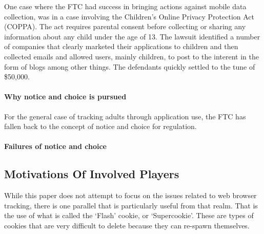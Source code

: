 One case where the FTC had success in bringing actions against mobile data collection, was in a case involving the Children's Online Privacy Protection Act (COPPA). The act requires parental consent before collecting or sharing any information about any child under the age of 13. The lawsuit identified a number of companies that clearly marketed their applications to children and then collected emails and allowed users, mainly children, to post to the interent in the form of blogs among other things\cite{ftc2011}. The defendants quickly settled to the tune of \$50,000. 


		\paragraph{Why notice and choice is pursued}

For the general case of tracking adults through application use, the FTC has fallen back to the concept of notice and choice for regulation. 


		\paragraph{Failures of notice and choice}


	\subsection{Motivations Of Involved Players}


While this paper does not attempt to focus on the issues related to web browser tracking, there is one parallel that is particularly useful from that realm. That is the use of what is called the `Flash' cookie, or `Supercookie'. These are types of cookies that are very difficult to delete because they can re-spawn themselves. 

